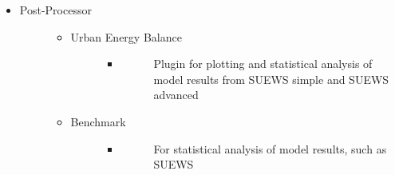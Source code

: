 \documentclass[letterpaper,10pt,english]{sphinxmanual}
\begin{document}
\begin{itemize}
\begin{description}
\begin{itemize}
\begin{description}
\begin{itemize}
\begin{description}
\end{description}

\end{itemize}

\end{description}

\end{itemize}

\end{description}

\item {} \begin{description}
\item[{Post-Processor}] \leavevmode\begin{itemize}
\item {} \begin{description}
\item[{Urban Energy Balance}] \leavevmode\begin{itemize}
\item {} \begin{description}
\item[{}] \leavevmode
Plugin for plotting and statistical analysis of model results from SUEWS simple and SUEWS advanced

\end{description}

\end{itemize}

\end{description}

\item {} \begin{description}
\item[{Benchmark}] \leavevmode\begin{itemize}
\item {} \begin{description}
\item[{}] \leavevmode
For statistical analysis of model results, such as SUEWS

\end{description}

\end{itemize}

\end{description}

\end{itemize}

\end{description}

\end{itemize}
\end{document}
